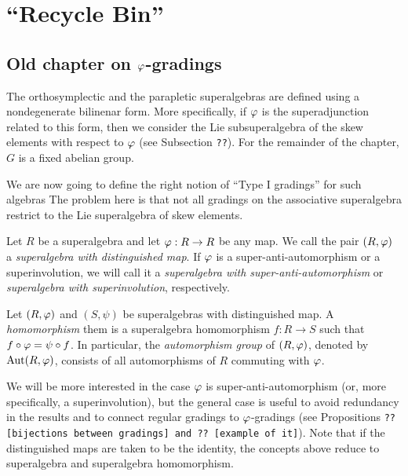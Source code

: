 
\chapter{``Recycle Bin''}


\section{Old chapter on $\varphi$-gradings}

The orthosymplectic and the parapletic superalgebras are defined using a nondegenerate bilinenar form. More specifically, if $\varphi$ is the superadjunction related to this form, then we consider the Lie subsuperalgebra of the skew elements with respect to $\varphi$ (see Subsection {\tt ??}). For the remainder of the chapter, $G$ is a fixed abelian group.

We are now going to define the right notion of ``Type I gradings'' for such algebras %
The problem here is that not all gradings on the associative superalgebra restrict to the Lie superalgebra of skew elements.

\begin{defi}
    Let $R$ be a superalgebra and let $\varphi: R\to R$ be any map. We call the pair $(R, \varphi)$ a \emph{superalgebra with distinguished map}. If $\varphi$ is a super-anti-automorphism or a superinvolution, we will call it a \emph{superalgebra with super-anti-automorphism} or \emph{superalgebra with superinvolution}, respectively.
\end{defi}

\begin{defi}
    Let $(R, \varphi)$ and $(S, \psi)$ be superalgebras with distinguished map. A \emph{homomorphism} them is a superalgebra homomorphism $f: R\to S$ such that $f\circ \varphi = \psi \circ f$. In particular, the \emph{automorphism group} of $(R, \varphi)$, denoted by $\operatorname{Aut}(R, \varphi)$, consists of all automorphisms of $R$ commuting with $\varphi$.
\end{defi}

We will be more interested in the case $\varphi$ is super-anti-automorphism (or, more specifically, a superinvolution), but the general case is useful to avoid redundancy in the results and to connect regular gradings to $\varphi$-gradings (see Propositions \texttt{?? [bijections between gradings]  and ?? [example of it]}). Note that if the distinguished maps are taken to be the identity, the concepts above reduce to superalgebra and superalgebra homomorphism. 

